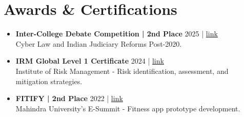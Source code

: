 \documentclass[a4paper,11pt]{article}
\newcommand{\resumeAward}[4]{\item
  \textbf{#1} \hfill #3 | \href{#4}{link} \\
  #2 \vspace{-1mm}
}
\begin{document}
\section{\textbf{Awards \& Certifications}}
\begin{itemize}[leftmargin=*,itemsep=1mm]
\resumeAward{Inter-College Debate Competition | 2nd Place}
{Cyber Law and Indian Judiciary Reforms Post-2020.}
{2025}
{https://drive.google.com/file/d/11uASYH2UqavtXNcwyxmgaJoMjOUqwSY0/view?usp=sharing}

\resumeAward{IRM Global Level 1 Certificate}
{Institute of Risk Management - Risk identification, assessment, and mitigation strategies.}
{2024}
{https://drive.google.com/file/d/1bQqinD-PEgxwXxF4pJlvSC022TX1KDnj/view?usp=sharing}

\resumeAward{FITIFY | 2nd Place}
{Mahindra University's E-Summit - Fitness app prototype development.}
{2022}
{https://drive.google.com/file/d/15pDKqMnI5vn3K-LuLI3v0hInWTLnmQs-/view?usp=sharing}
\end{itemize}
\end{document}
